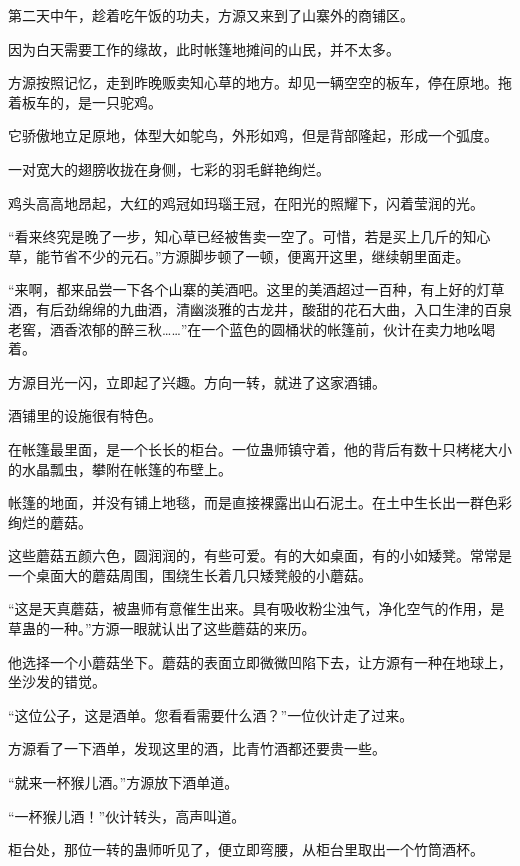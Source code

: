 
\begin{this_body}

第二天中午，趁着吃午饭的功夫，方源又来到了山寨外的商铺区。

因为白天需要工作的缘故，此时帐篷地摊间的山民，并不太多。

方源按照记忆，走到昨晚贩卖知心草的地方。却见一辆空空的板车，停在原地。拖着板车的，是一只驼鸡。

它骄傲地立足原地，体型大如鸵鸟，外形如鸡，但是背部隆起，形成一个弧度。

一对宽大的翅膀收拢在身侧，七彩的羽毛鲜艳绚烂。

鸡头高高地昂起，大红的鸡冠如玛瑙王冠，在阳光的照耀下，闪着莹润的光。

“看来终究是晚了一步，知心草已经被售卖一空了。可惜，若是买上几斤的知心草，能节省不少的元石。”方源脚步顿了一顿，便离开这里，继续朝里面走。

“来啊，都来品尝一下各个山寨的美酒吧。这里的美酒超过一百种，有上好的灯草酒，有后劲绵绵的九曲酒，清幽淡雅的古龙井，酸甜的花石大曲，入口生津的百泉老窖，酒香浓郁的醉三秋……”在一个蓝色的圆桶状的帐篷前，伙计在卖力地吆喝着。

方源目光一闪，立即起了兴趣。方向一转，就进了这家酒铺。

酒铺里的设施很有特色。

在帐篷最里面，是一个长长的柜台。一位蛊师镇守着，他的背后有数十只栲栳大小的水晶瓢虫，攀附在帐篷的布壁上。

帐篷的地面，并没有铺上地毯，而是直接裸露出山石泥土。在土中生长出一群色彩绚烂的蘑菇。

这些蘑菇五颜六色，圆润润的，有些可爱。有的大如桌面，有的小如矮凳。常常是一个桌面大的蘑菇周围，围绕生长着几只矮凳般的小蘑菇。

“这是天真蘑菇，被蛊师有意催生出来。具有吸收粉尘浊气，净化空气的作用，是草蛊的一种。”方源一眼就认出了这些蘑菇的来历。

他选择一个小蘑菇坐下。蘑菇的表面立即微微凹陷下去，让方源有一种在地球上，坐沙发的错觉。

“这位公子，这是酒单。您看看需要什么酒？”一位伙计走了过来。

方源看了一下酒单，发现这里的酒，比青竹酒都还要贵一些。

“就来一杯猴儿酒。”方源放下酒单道。

“一杯猴儿酒！”伙计转头，高声叫道。

柜台处，那位一转的蛊师听见了，便立即弯腰，从柜台里取出一个竹筒酒杯。


\end{this_body}
